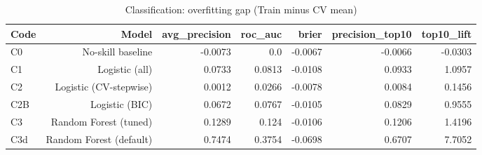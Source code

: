 \begin{table}[htbp]
\centering
\small
\caption{Classification: overfitting gap (Train minus CV mean)}
\begin{tabular}{lrrrrrr}
\toprule
Code & Model & avg\_precision & roc\_auc & brier & precision\_top10 & top10\_lift \\
\midrule
C0 & No-skill baseline & -0.0073 & 0.0 & -0.0067 & -0.0066 & -0.0303 \\
C1 & Logistic (all) & 0.0733 & 0.0813 & -0.0108 & 0.0933 & 1.0957 \\
C2 & Logistic (CV-stepwise) & 0.0012 & 0.0266 & -0.0078 & 0.0084 & 0.1456 \\
C2B & Logistic (BIC) & 0.0672 & 0.0767 & -0.0105 & 0.0829 & 0.9555 \\
C3 & Random Forest (tuned) & 0.1289 & 0.124 & -0.0106 & 0.1206 & 1.4196 \\
C3d & Random Forest (default) & 0.7474 & 0.3754 & -0.0698 & 0.6707 & 7.7052 \\
\bottomrule
\end{tabular}
\par\smallskip\begin{minipage}{\linewidth}\footnotesize \end{minipage}
\end{table}

